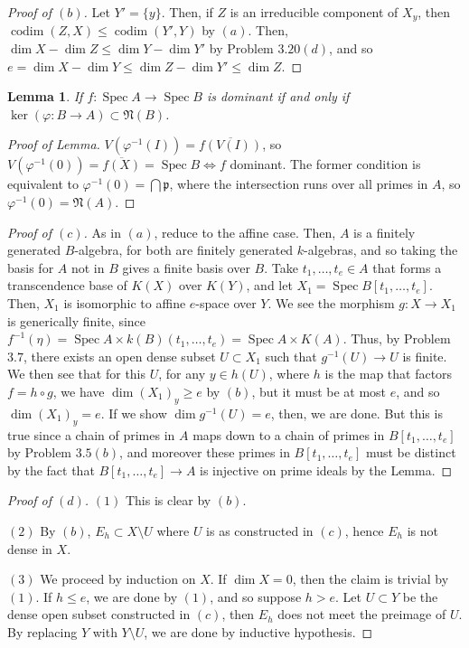 \documentclass[12pt,letterpaper]{article}
\newtheorem{lemma}{Lemma}
\theoremstyle{definition}
\theoremstyle{remark}
\numberwithin{equation}{section}
\numberwithin{figure}{problem}
\DeclareMathOperator{\Spec}{Spec}
\DeclareMathOperator{\codim}{codim}
\begin{document}
\begin{proof}[Proof of $(b)$]
  Let $Y' = \{y\}$. Then, if $Z$ is an irreducible component of $X_y$, then $\codim(Z,X) \le \codim(Y',Y)$ by $(a)$. Then, $\dim X - \dim Z \le \dim Y - \dim Y'$ by Problem $3.20(d)$, and so $e = \dim X - \dim Y \le \dim Z - \dim Y' \le \dim Z$.
\end{proof}
\begin{lemma}
  If $f\colon \Spec A \to \Spec B$ is dominant if and only if $\ker(\varphi\colon B \to A) \subset \mathfrak{N}(B)$.
\end{lemma}
\begin{proof}[Proof of Lemma]
  $V(\varphi^{-1}(I)) = \overline{f(V(I))}$, so $V(\varphi^{-1}(0)) = \overline{f(X)} = \Spec B \Leftrightarrow f$ dominant. The former condition is equivalent to $\varphi^{-1}(0) = \bigcap \mathfrak{p}$, where the intersection runs over all primes in $A$, so $\varphi^{-1}(0) = \mathfrak{N}(A)$.
\end{proof}
\begin{proof}[Proof of $(c)$]
  As in $(a)$, reduce to the affine case. Then, $A$ is a finitely generated $B$-algebra, for both are finitely generated $k$-algebras, and so taking the basis for $A$ not in $B$ gives a finite basis over $B$. Take $t_1,\ldots,t_e \in A$ that forms a transcendence base of $K(X)$ over $K(Y)$, and let $X_1 = \Spec B[t_1,\ldots,t_e]$. Then, $X_1$ is isomorphic to affine $e$-space over $Y$. We see the morphism $g\colon X \to X_1$ is generically finite, since $f^{-1}(\eta) = \Spec A \times k(B)(t_1,\ldots,t_e) = \Spec A \times K(A)$. Thus, by Problem $3.7$, there exists an open dense subset $U \subset X_1$ such that $g^{-1}(U) \to U$ is finite. We then see that for this $U$, for any $y \in h(U)$, where $h$ is the map that factors $f = h \circ g$, we have $\dim (X_1)_y \ge e$ by $(b)$, but it must be at most $e$, and so $\dim (X_1)_y = e$. If we show $\dim g^{-1}(U) = e$, then, we are done. But this is true since a chain of primes in $A$ maps down to a chain of primes in $B[t_1,\ldots,t_e]$ by Problem $3.5(b)$, and moreover these primes in $B[t_1,\ldots,t_e]$ must be distinct by the fact that $B[t_1,\ldots,t_e] \to A$ is injective on prime ideals by the Lemma.
\end{proof}
\begin{proof}[Proof of $(d)$]
  $(1)$ This is clear by $(b)$.
  \par $(2)$ By $(b)$, $E_h \subset X \setminus U$ where $U$ is as constructed in $(c)$, hence $E_h$ is not dense in $X$.
  \par $(3)$ We proceed by induction on $X$. If $\dim X = 0$, then the claim is trivial by $(1)$. If $h \le e$, we are done by $(1)$, and so suppose $h > e$. Let $U \subset Y$ be the dense open subset constructed in $(c)$, then $E_h$ does not meet the preimage of $U$. By replacing $Y$ with $Y \setminus U$, we are done by inductive hypothesis.
\end{proof}
\end{document}
